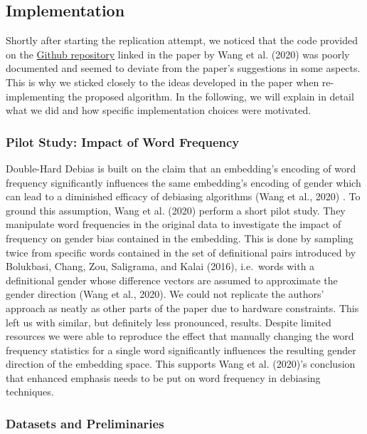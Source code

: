 \documentclass[
  english,
  man,floatsintext]{apa6}
\begin{document}
\hypertarget{implementation}{%
\subsection{Implementation}\label{implementation}}

Shortly after starting the replication attempt, we noticed that the code provided on the \href{https://github.com/uvavision/Double-Hard-Debias}{Github repository} linked in the paper by Wang et al. (2020) was poorly documented and seemed to deviate from the paper's suggestions in some aspects. This is why we sticked closely to the ideas developed in the paper when re-implementing the proposed algorithm. In the following, we will explain in detail what we did and how specific implementation choices were motivated.

\hypertarget{pilot-study-impact-of-word-frequency}{%
\subsubsection{Pilot Study: Impact of Word Frequency}\label{pilot-study-impact-of-word-frequency}}

Double-Hard Debias is built on the claim that an embedding's encoding of word frequency significantly influences the same embedding's encoding of gender which can lead to a diminished efficacy of debiasing algorithms (Wang et al., 2020) . To ground this assumption, Wang et al. (2020) perform a short pilot study. They manipulate word frequencies in the original data to investigate the impact of frequency on gender bias contained in the embedding. This is done by sampling twice from specific words contained in the set of definitional pairs introduced by Bolukbasi, Chang, Zou, Saligrama, and Kalai (2016), i.e.~words with a definitional gender whose difference vectors are assumed to approximate the gender direction (Wang et al., 2020).
We could not replicate the authors' approach as neatly as other parts of the paper due to hardware constraints. This left us with similar, but definitely less pronounced, results. Despite limited resources we were able to reproduce the effect that manually changing the word frequency statistics for a single word significantly influences the resulting gender direction of the embedding space. This supports Wang et al. (2020)'s conclusion that enhanced emphasis needs to be put on word frequency in debiasing techniques.

\hypertarget{datasets-and-preliminaries}{%
\subsubsection{Datasets and Preliminaries}\label{datasets-and-preliminaries}}
\end{document}
